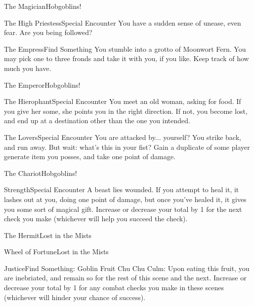 \documentclass[white]{gl2018}
\begin{document}
\begin{location}{The Magician}{Hobgoblins!}
\end{location}
\begin{location}{The High Priestess}{Special Encounter}
You have a sudden sense of unease, even fear.  Are you being followed?
\end{location}
\begin{location}{The Empress}{Find Something}
You stumble into a grotto of Moonwort Fern.  You may pick one to three fronds and take it with you, if you like.  Keep track of how much you have.
\end{location}
\begin{location}{The Emperor}{Hobgoblins!}
\end{location}
\begin{location}{The Hierophant}{Special Encounter}
You meet an old woman, asking for food.  If you give her some, she points you in the right direction.  If not, you become lost, and end up at a destination other than the one you intended.
\end{location}
\begin{location}{The Lovers}{Special Encounter}
You are attacked by... yourself? You strike back, and run away. But wait: what's this in your fist? Gain a duplicate of some player generate item you posses, and take one point of damage.
\end{location}
\begin{location}{The Chariot}{Hobgoblins!}
\end{location}
\begin{location}{Strength}{Special Encounter}
A beast lies wounded.  If you attempt to heal it, it lashes out at you, doing one point of damage, but once you've healed it, it gives you some sort of magical gift. Increase or decrease your total by 1 for the next check you make (whichever will help you succeed the check). 
\end{location}
\begin{location}{The Hermit}{Lost in the Mists}
\end{location}
\begin{location}{Wheel of Fortune}{Lost in the Mists}
\end{location}
\begin{location}{Justice}{Find Something: Goblin Fruit}
Chu Chu Culm: Upon eating this fruit, you are inebriated, and remain so for the rest of this scene and the next.  Increase or decrease your total by 1 for any combat checks you make in these scenes (whichever will hinder your chance of success).
\end{location}
\end{document}
